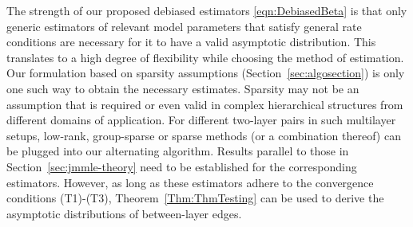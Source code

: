 The strength of our proposed debiased estimators \eqref{eqn:DebiasedBeta} is that only generic estimators of relevant model parameters that satisfy general rate conditions are necessary for it to have a valid asymptotic distribution. This translates to a high degree of flexibility while choosing the method of estimation. Our formulation based on sparsity assumptions (Section~\ref{sec:algosection}) is only one such way to obtain the necessary estimates. Sparsity may not be an assumption that is required or even valid in complex hierarchical structures from different domains of application. For different two-layer pairs in such multilayer setups, low-rank, group-sparse or sparse methods (or a combination thereof) can be plugged into our alternating algorithm. Results parallel to those in Section~\ref{sec:jmmle-theory} need to be established for the corresponding estimators. However, as long as these estimators adhere to the convergence conditions (T1)-(T3), Theorem~\ref{Thm:ThmTesting} can be used to derive the asymptotic distributions of between-layer edges.